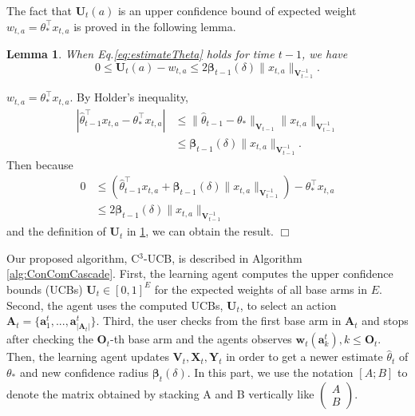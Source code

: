 \documentclass{article}
\newcommand{\bbeta}{\boldsymbol{\beta}}
\newcommand{\bA}{\mathbf{A}}
\newcommand{\ba}{\mathbf{a}}
\newcommand{\bO}{\mathbf{O}}
\newcommand{\bU}{\mathbf{U}}
\newcommand{\bV}{\mathbf{V}}
\newcommand{\bw}{\mathbf{w}}
\newcommand{\bX}{\mathbf{X}}
\newcommand{\bY}{\mathbf{Y}}
\newcommand{\abs}[1]{\left| #1 \right|}
\newcommand{\norm}[1]{\| #1 \|}
\newtheorem{lemma}[theorem]{Lemma}%
\newenvironment{proof}{\noindent {\textbf{Proof. }}}{$\Box$ \medskip}
\begin{document}
The fact that $\bU_t(a)$ is an upper confidence bound of expected weight $w_{t, a} = \theta_*^{\top} x_{t,a}$ is proved in the following lemma.
\begin{lemma} %
  \label{lem:estimateU}
  When Eq.\eqref{eq:estimateTheta} holds for time $t-1$, we have
  $$
    0 \leq \bU_t(a) - w_{t,a} \leq 2 \bbeta_{t-1}(\delta)\norm{x_{t,a}}_{\bV_{t-1}^{-1}}.
  $$
\end{lemma}
\begin{proof}
	$w_{t,a} = \theta_*^{\top} x_{t,a}$. By Holder's inequality,
	\begin{align*}
		\abs{\hat{\theta}_{t-1}^{\top}x_{t,a} - \theta_{\ast}^{\top}x_{t,a}} &\leq \norm{\hat{\theta}_{t-1} - \theta_{\ast}}_{\bV_{t-1}} \norm{x_{t,a}}_{\bV_{t-1}^{-1}} \\
		&\leq \bbeta_{t-1}(\delta)\norm{x_{t,a}}_{\bV_{t-1}^{-1}}.
	\end{align*}
	Then because
	\begin{align*}
		0 &\leq (\hat{\theta}_{t-1}^{\top}x_{t,a} + \bbeta_{t-1}(\delta)\norm{x_{t,a}}_{\bV_{t-1}^{-1}}) - \theta_{\ast}^{\top}x_{t,a} \\
		&\leq 2 \bbeta_{t-1}(\delta)\norm{x_{t,a}}_{\bV_{t-1}^{-1}}
	\end{align*}
	and the definition of $\bU_t$ in \ref{lem:estimateU}, we can obtain the result.
\end{proof}

Our proposed algorithm, C$^3$-UCB, is described in Algorithm \ref{alg:ConComCascade}. First, the learning agent computes the upper confidence bounds (UCBs) $\bU_t \in [0,1]^{E}$ for the expected weights of all base arms in $E$. Second, the agent uses the computed UCBs, $\bU_t$, to select an action $\bA_t = \{\ba_{1}^t,..., \ba_{\abs{\bA_t}}^t \}$. Third, the user checks from the first base arm in $\bA_t$ and stops after checking the $\bO_t$-th base arm and the agents observes $\bw_t(\ba_k^t), k\leq \bO_t$. Then, the learning agent updates $\bV_t, \bX_t, \bY_t$ in order to get a newer estimate $\hat{\theta}_t$ of $\theta_*$ and new confidence radius $\bbeta_t(\delta)$. In this part, we use the notation $[A; B]$ to denote the matrix obtained by stacking A and B vertically like $\begin{pmatrix} A\\ B\end{pmatrix}$.
\end{document}
